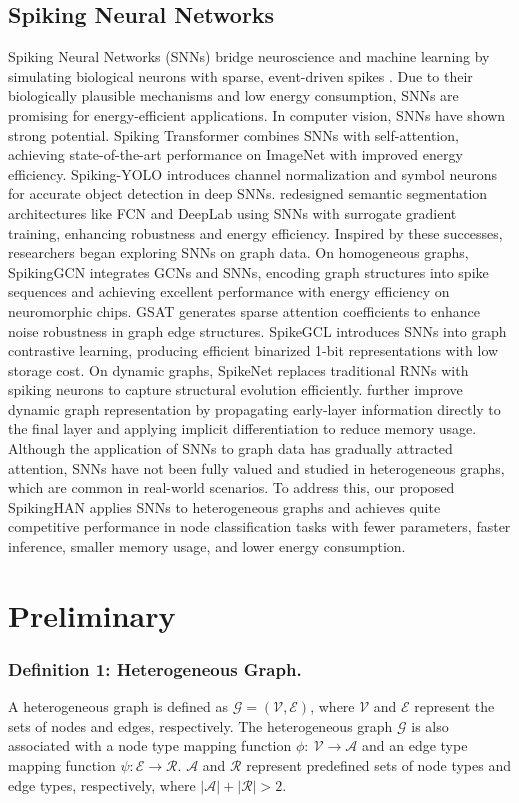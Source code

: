 \documentclass[letterpaper]{article} %
\begin{document}
\subsection{Spiking Neural Networks}
Spiking Neural Networks (SNNs) bridge neuroscience and machine learning by simulating biological neurons with sparse, event-driven spikes \cite{bib26}. Due to their biologically plausible mechanisms and low energy consumption, SNNs are promising for energy-efficient applications. In computer vision, SNNs have shown strong potential. Spiking Transformer \cite{bib27} combines SNNs with self-attention, achieving state-of-the-art performance on ImageNet with improved energy efficiency. Spiking-YOLO \cite{bib28} introduces channel normalization and symbol neurons for accurate object detection in deep SNNs. \cite{bib13} redesigned semantic segmentation architectures like FCN and DeepLab using SNNs with surrogate gradient training, enhancing robustness and energy efficiency. Inspired by these successes, researchers began exploring SNNs on graph data. On homogeneous graphs, SpikingGCN \cite{bib15} integrates GCNs and SNNs, encoding graph structures into spike sequences and achieving excellent performance with energy efficiency on neuromorphic chips. GSAT \cite{bib29} generates sparse attention coefficients to enhance noise robustness in graph edge structures. SpikeGCL \cite{bib16} introduces SNNs into graph contrastive learning, producing efficient binarized 1-bit representations with low storage cost. On dynamic graphs, SpikeNet \cite{bib14} replaces traditional RNNs with spiking neurons to capture structural evolution efficiently. \cite{bib17} further improve dynamic graph representation by propagating early-layer information directly to the final layer and applying implicit differentiation to reduce memory usage. Although the application of SNNs to graph data has gradually attracted attention, SNNs have not been fully valued and studied in heterogeneous graphs, which are common in real-world scenarios. To address this, our proposed SpikingHAN applies SNNs to heterogeneous graphs and achieves quite competitive performance in node classification tasks with fewer parameters, faster inference, smaller memory usage, and lower energy consumption.

\section{Preliminary}
\subsubsection{Definition 1: Heterogeneous Graph.} A heterogeneous graph is defined as $\mathcal{G}=(\mathcal{V}, \mathcal{E})$, where $\mathcal{V}$ and $\mathcal{E}$ represent the sets of nodes and edges, respectively. The heterogeneous graph $\mathcal{G}$ is also associated with a node type mapping function $\phi:\ \mathcal{V}\rightarrow\mathcal{A}$ and an edge type mapping function $\psi: \mathcal{E} \rightarrow \mathcal{R}$. $\mathcal{A}$ and $\mathcal{R}$ represent predefined sets of node types and edge types, respectively, where $|\mathcal{A}|+|\mathcal{R}|>2$. 
\end{document}
